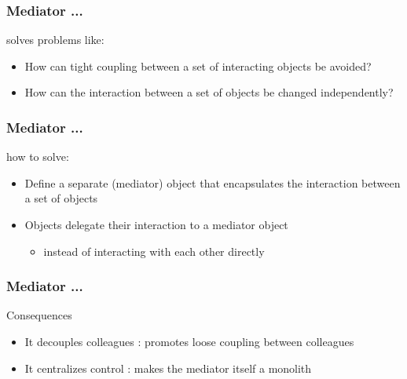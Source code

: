 \documentclass{beamer}
\begin{document}
\begin{frame}[fragile]
\frametitle{Mediator ...}

\begin{block}{solves problems like:}
\begin{itemize}
\item How can tight coupling between a set of interacting objects be avoided? 
\item How can the interaction between a set of objects be changed independently? 
\end{itemize}
\end{block}

\end{frame}

\begin{frame}[fragile]
\frametitle{Mediator ...}

\begin{block}{how to solve:}
\begin{itemize}
    \item Define a separate (mediator) object that encapsulates the interaction between a set of objects
    \item Objects delegate their interaction to a mediator object 
        \begin{itemize}
            \item instead of interacting with each other directly
        \end{itemize}
\end{itemize}
\end{block}

\end{frame}


\begin{frame}[fragile]
\frametitle{Mediator ...}

\begin{block}{Consequences}

\begin{itemize}
\item It decouples colleagues : promotes loose coupling between colleagues
\item It centralizes control  : makes the mediator itself a monolith
\end{itemize}

\end{block}

\end{frame}
\end{document}

